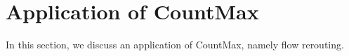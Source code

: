 


\section{Application of CountMax}\label{subsec:flowrerouting}
%
In this section, we discuss an application of CountMax, namely flow rerouting.


